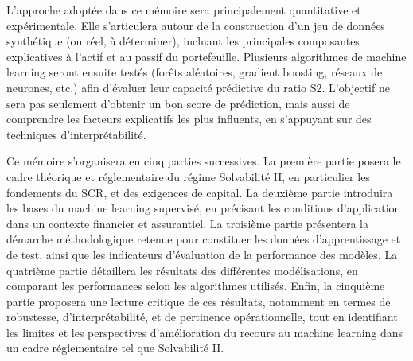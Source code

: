 L’approche adoptée dans ce mémoire sera principalement quantitative et expérimentale. Elle s’articulera autour de la construction d’un jeu de données synthétique (ou réel, à déterminer), incluant les principales composantes explicatives à l'actif et au passif du portefeuille. Plusieurs algorithmes de machine learning seront ensuite testés (forêts aléatoires, gradient boosting, réseaux de neurones, etc.) afin d’évaluer leur capacité prédictive du ratio S2. L’objectif ne sera pas seulement d’obtenir un bon score de prédiction, mais aussi de comprendre les facteurs explicatifs les plus influents, en s’appuyant sur des techniques d’interprétabilité.

Ce mémoire s’organisera en cinq parties successives. La première partie posera le cadre théorique et réglementaire du régime Solvabilité II, en particulier les fondements du SCR, et des exigences de capital. La deuxième partie introduira les bases du machine learning supervisé, en précisant les conditions d’application dans un contexte financier et assurantiel. La troisième partie présentera la démarche méthodologique retenue pour constituer les données d’apprentissage et de test, ainsi que les indicateurs d’évaluation de la performance des modèles. La quatrième partie détaillera les résultats des différentes modélisations, en comparant les performances selon les algorithmes utilisés. Enfin, la cinquième partie proposera une lecture critique de ces résultats, notamment en termes de robustesse, d’interprétabilité, et de pertinence opérationnelle, tout en identifiant les limites et les perspectives d’amélioration du recours au machine learning dans un cadre réglementaire tel que Solvabilité II.